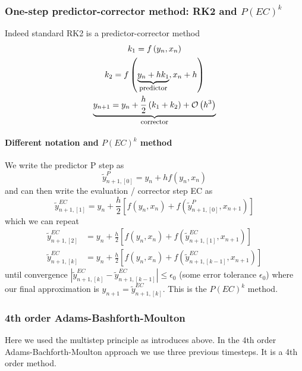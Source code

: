 \subsubsection{One-step predictor-corrector method: RK2 and $P(EC)^k$}
Indeed standard RK2 is a predictor-corrector method
\begin{equation}
  \begin{gathered}
    k_1=f\left(y_{n}, x_{n}\right) \\
    k_2=f\left(\explain{y_{n}+h k_1}{predictor}, x_n+h\right) \\
    \explain{y_{n + 1}=y_{n}+\frac{h}{2}\left(k_1+k_2\right)+\mathcal{O}\left(h^3\right)}{corrector}
  \end{gathered}
\end{equation}
\paragraph{Different notation and $P(EC)^k$ method} We write the predictor P step as
\begin{equation}
  \tilde{y}_{n+1,[0]}^{P} = y_n + hf(y_n,x_n)
\end{equation}
and can then write the evaluation / corrector step EC as
\begin{equation}
  \tilde{y}_{n+1,[1]}^{EC} = y_n + \frac{h}{2} \left[ f(y_n,x_n) + f(\tilde{y}_{n+1,[0]}^{P},x_{n+1}) \right]
\end{equation}
which we can repeat
\begin{equation}
  \begin{aligned}
    \tilde{y}_{n+1,[2]}^{EC} &= y_n + \frac{h}{2} \left[ f(y_n,x_n) + f(\tilde{y}_{n+1,[1]}^{EC},x_{n+1}) \right] \\
    \tilde{y}_{n+1,[k]}^{EC} &= y_n + \frac{h}{2} \left[ f(y_n,x_n) + f(\tilde{y}_{n+1,[k-1]}^{EC},x_{n+1}) \right]
  \end{aligned}
\end{equation}
until convergence $|\tilde{y}_{n+1,[k]}^{EC} - \tilde{y}_{n+1,[k-1]}^{EC}| \leq \epsilon_0$ (some error tolerance $\epsilon_0$) where
our final approximation is $y_{n+1} = \tilde{y}_{n+1,[k]}^{EC}$. This is the $P(EC)^k$ method.

\subsubsection{4th order Adams-Bashforth-Moulton}
Here we used the multistep principle as introduces above. In the 4th order Adams-Bachforth-Moulton approach
we use three previous timesteps. It is a 4th order method.

